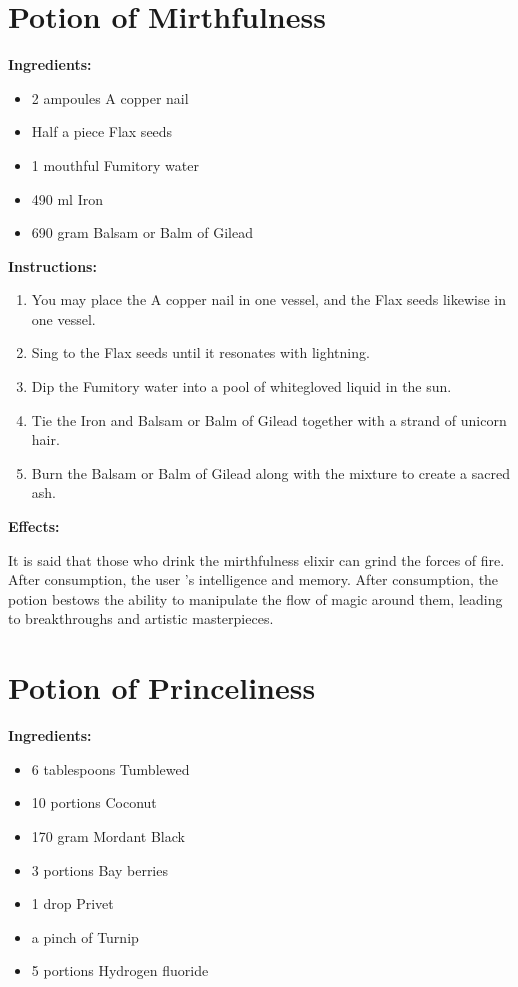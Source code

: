 \documentclass{article}
\begin{document}
\newpage
\section*{Potion of Mirthfulness}

\textbf{Ingredients:}

\begin{itemize}
  \item 2 ampoules A copper nail
  \item Half a piece Flax seeds
  \item 1 mouthful Fumitory water
  \item 490 ml Iron
  \item 690 gram Balsam or Balm of Gilead
\end{itemize}

\textbf{Instructions:}

\begin{enumerate}
  \item You may place the A copper nail in one vessel, and the Flax seeds likewise in one vessel.
  \item Sing to the Flax seeds until it resonates with lightning.
  \item Dip the Fumitory water into a pool of whitegloved liquid in the sun.
  \item Tie the Iron and Balsam or Balm of Gilead together with a strand of unicorn hair.
  \item Burn the Balsam or Balm of Gilead along with the mixture to create a sacred ash.
\end{enumerate}

\textbf{Effects:}

It is said that those who drink the mirthfulness elixir can grind the forces of fire. After consumption, the user 's intelligence and memory. After consumption, the potion bestows the ability to manipulate the flow of magic around them, leading to breakthroughs and artistic masterpieces.

\newpage
\section*{Potion of Princeliness}

\textbf{Ingredients:}

\begin{itemize}
  \item 6 tablespoons Tumblewed
  \item 10 portions Coconut
  \item 170 gram Mordant Black
  \item 3 portions Bay berries
  \item 1 drop Privet
  \item a pinch of Turnip
  \item 5 portions Hydrogen fluoride
\end{itemize}
\end{document}
